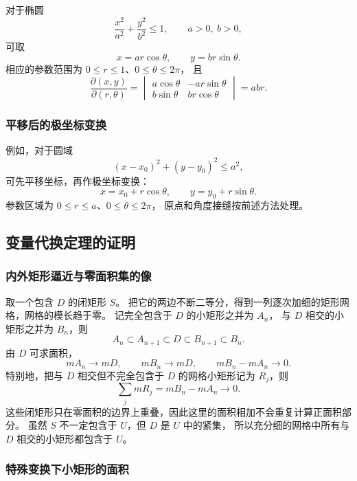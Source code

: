 对于椭圆
\[
\frac{x^2}{a^2}+\frac{y^2}{b^2}\le1,
\qquad a>0,\ b>0,
\]
可取
\[
x=ar\cos\theta,\qquad y=br\sin\theta.
\]
相应的参数范围为 $0\le r\le1$、$0\le\theta\le2\pi$，
且
\[
\frac{\partial(x,y)}{\partial(r,\theta)}
=\begin{vmatrix}
a\cos\theta&-ar\sin\theta\\
b\sin\theta&br\cos\theta
\end{vmatrix}
=abr.
\]

\subsubsection*{平移后的极坐标变换}

例如，对于圆域
\[
(x-x_0)^2+(y-y_0)^2\le a^2,
\]
可先平移坐标，再作极坐标变换：
\[
x=x_0+r\cos\theta,\qquad
y=y_0+r\sin\theta.
\]
参数区域为 $0\le r\le a$、$0\le\theta\le2\pi$，
原点和角度接缝按前述方法处理。

\begin{center}

\end{center}

\subsection*{变量代换定理的证明}



\subsubsection*{内外矩形逼近与零面积集的像}

取一个包含 $D$ 的闭矩形 $S$。
把它的两边不断二等分，得到一列逐次加细的矩形网格，网格的模长趋于零。
记完全包含于 $D$ 的小矩形之并为 $A_n$，
与 $D$ 相交的小矩形之并为 $B_n$，则
\[
A_n\subset A_{n+1}\subset D\subset B_{n+1}\subset B_n.
\]
由 $D$ 可求面积，
\[
mA_n\longrightarrow mD,\qquad mB_n\longrightarrow mD,
\qquad mB_n-mA_n\longrightarrow0.
\]
特别地，把与 $D$ 相交但不完全包含于 $D$ 的网格小矩形记为 $R_j$，则
\[
\sum_jmR_j=mB_n-mA_n\longrightarrow0.
\]
这些闭矩形只在零面积的边界上重叠，因此这里的面积相加不会重复计算正面积部分。
虽然 $S$ 不一定包含于 $U$，但 $D$ 是 $U$ 中的紧集，
所以充分细的网格中所有与 $D$ 相交的小矩形都包含于 $U$。

\subsubsection*{特殊变换下小矩形的面积}

